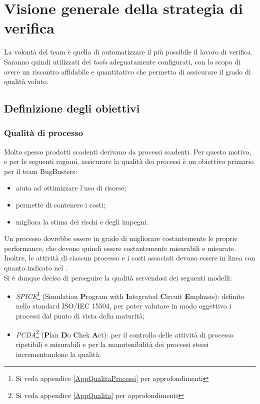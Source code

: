 \section{Visione generale della strategia di verifica}
La volontà del team è quella di automatizzare il più possibile il lavoro di verifica. Saranno quindi utilizzati dei \textit{tools} adeguatamente configurati, con lo scopo di avere un riscontro affidabile e quantitativo che permetta di assicurare il grado di qualità voluto. 

\subsection{Definizione degli obiettivi}
\subsubsection{Qualità di processo}
Molto spesso prodotti scadenti derivano da processi scadenti. Per questo motivo, e per le seguenti ragioni, assicurare la qualità dei processi è un obiettivo primario per il team BugBusters:
\begin{itemize}
	\item aiuta ad ottimizzare l'uso di risorse;
	\item permette di contenere i costi;
	\item migliora la stima dei rischi e degli impegni.
\end{itemize}
Un processo dovrebbe essere in grado di migliorare costantemente le proprie performance, che devono quindi essere costantemente misurabili e misurate. Inoltre, le attività di ciascun processo e i costi associati devono essere in linea con quanto indicato nel \PianoDiProgetto. \\
Si è dunque deciso di perseguire la qualità servendosi dei seguenti modelli: 
\begin{itemize}
	\item \textit{SPICE}\footnote{Si veda appendice \ref{AppQualitaProcessi} per approfondimenti} (Simulation \textbf{P}rogram with \textbf{I}ntegrated \textbf{C}ircuit \textbf{E}mphasis): definito nello standard ISO/IEC 15504, per poter valutare in modo oggettivo i processi dal punto di vista della maturità;
	\item \textit{PCDA}\footnote{Si veda appendice \ref{AppQualita} per approfondimenti} (\textbf{P}lan \textbf{D}o \textbf{C}hek \textbf{A}ct): per il controllo delle attività di processo ripetibili e misurabili e per la manutenibilità dei processi stessi incrementandone la qualità.
\end{itemize}

